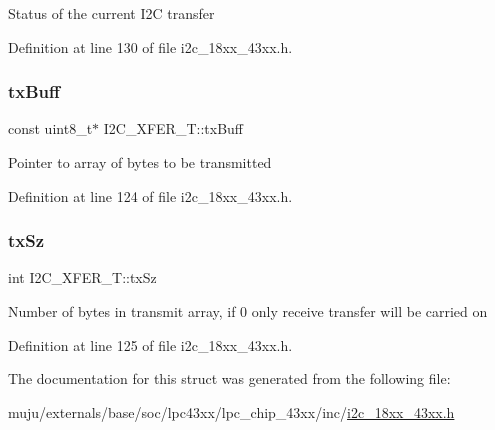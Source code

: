 Status of the current I2C transfer 

Definition at line 130 of file i2c\+\_\+18xx\+\_\+43xx.\+h.

\mbox{\label{struct_i2_c___x_f_e_r___t_a673ce41b59a715c6e91e3d041885554b}} 
\subsubsection{\texorpdfstring{tx\+Buff}{txBuff}}
{\footnotesize\ttfamily const uint8\+\_\+t$\ast$ I2\+C\+\_\+\+X\+F\+E\+R\+\_\+\+T\+::tx\+Buff}

Pointer to array of bytes to be transmitted 

Definition at line 124 of file i2c\+\_\+18xx\+\_\+43xx.\+h.

\mbox{\label{struct_i2_c___x_f_e_r___t_a6ff8668411b06d3dc4ab9d942ffca896}} 
\subsubsection{\texorpdfstring{tx\+Sz}{txSz}}
{\footnotesize\ttfamily int I2\+C\+\_\+\+X\+F\+E\+R\+\_\+\+T\+::tx\+Sz}

Number of bytes in transmit array, if 0 only receive transfer will be carried on 

Definition at line 125 of file i2c\+\_\+18xx\+\_\+43xx.\+h.



The documentation for this struct was generated from the following file\+:\begin{DoxyCompactItemize}
\item 
muju/externals/base/soc/lpc43xx/lpc\+\_\+chip\+\_\+43xx/inc/\hyperlink{i2c__18xx__43xx_8h}{i2c\+\_\+18xx\+\_\+43xx.\+h}\end{DoxyCompactItemize}
